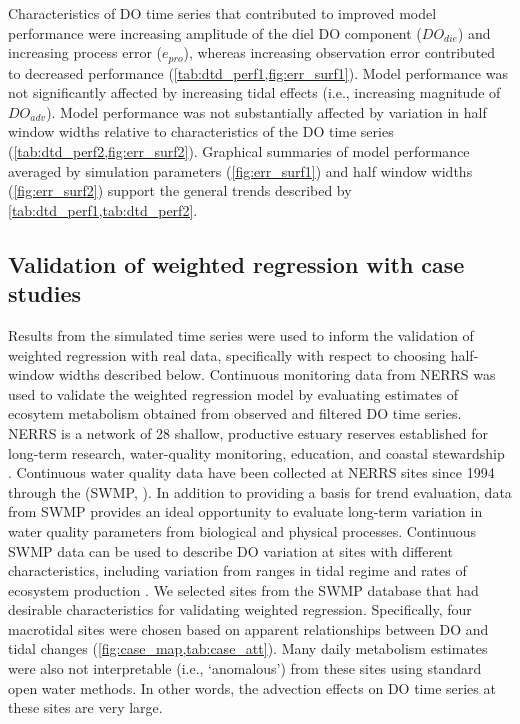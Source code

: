 \documentclass[letterpaper,12pt,oneside]{article}\usepackage[]{graphicx}\usepackage[]{color}
\begin{document}
Characteristics of \ac{DO} time series that contributed to improved model performance were increasing amplitude of the diel \ac{DO} component ($DO_{die}$) and increasing process error ($e_{pro}$), whereas increasing observation error contributed to decreased performance (\cref{tab:dtd_perf1,fig:err_surf1}).  Model performance was not significantly affected by increasing tidal effects (i.e., increasing magnitude of $DO_{adv}$).  Model performance was not substantially affected by variation in half window widths relative to characteristics of the \ac{DO} time series (\cref{tab:dtd_perf2,fig:err_surf2}).  Graphical summaries of model performance averaged by simulation parameters (\cref{fig:err_surf1}) and half window widths (\cref{fig:err_surf2}) support the general trends described by \cref{tab:dtd_perf1,tab:dtd_perf2}.

\subsection{Validation of weighted regression with case studies}

Results from the simulated time series were used to inform the validation of weighted regression with real data, specifically with respect to choosing half-window widths described below.  Continuous monitoring data from \ac{NERRS} was used to validate the weighted regression model by evaluating estimates of ecosytem metabolism obtained from observed and filtered \ac{DO} time series. \ac{NERRS} is a network of 28 shallow, productive estuary reserves established for long-term research, water-quality monitoring, education, and coastal stewardship \citep{Wenner04}.  Continuous water quality data have been collected at \ac{NERRS} sites since 1994 through the  (\acs{SWMP}, ).  In addition to providing a basis for trend evaluation, data from \ac{SWMP} provides an ideal opportunity to evaluate long-term variation in water quality parameters from biological and physical processes.  Continuous \ac{SWMP} data can be used to describe \ac{DO} variation at sites with different characteristics, including variation from ranges in tidal regime \citep{Sanger02} and rates of ecosystem production \citep{Caffrey03,Caffrey04}.  We selected sites from the \ac{SWMP} database that had desirable characteristics for validating weighted regression.  Specifically, four macrotidal sites were chosen based on apparent relationships between \ac{DO} and tidal changes (\cref{fig:case_map,tab:case_att}).  Many daily metabolism estimates were also not interpretable (i.e., `anomalous') from these sites using standard open water methods.  In other words, the advection effects on \ac{DO} time series at these sites are very large.  
\end{document}
